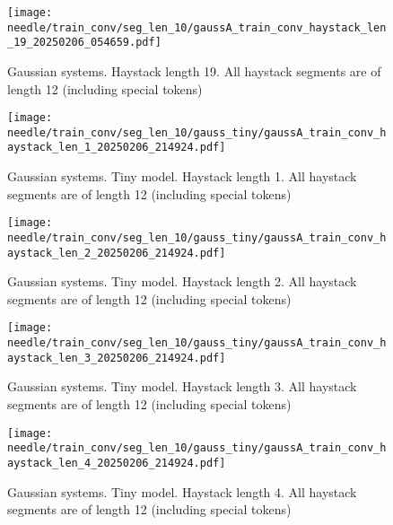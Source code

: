 \begin{figure}
    \centering
    \texttt{[image: needle/train\_conv/seg\_len\_10/gaussA\_train\_conv\_haystack\_len\_19\_20250206\_054659.pdf]}
    \caption{Gaussian systems. Haystack length 19. All haystack segments are of length 12 (including special tokens)}
    \label{fig:gauss_needle_train_conv_haystack_len_19_all_haystack_len_12}
\end{figure}




\begin{figure}[h]
    \centering
    \texttt{[image: needle/train\_conv/seg\_len\_10/gauss\_tiny/gaussA\_train\_conv\_haystack\_len\_1\_20250206\_214924.pdf]}
    \caption{Gaussian systems. Tiny model. Haystack length 1. All haystack segments are of length 12 (including special tokens)}
    \label{fig:gauss_tiny_needle_train_conv_haystack_len_1_all_haystack_len_12}
\end{figure}

\begin{figure}[h]
    \centering
    \texttt{[image: needle/train\_conv/seg\_len\_10/gauss\_tiny/gaussA\_train\_conv\_haystack\_len\_2\_20250206\_214924.pdf]}
    \caption{Gaussian systems. Tiny model. Haystack length 2. All haystack segments are of length 12 (including special tokens)}
    \label{fig:gauss_tiny_needle_train_conv_haystack_len_2_all_haystack_len_12}
\end{figure}

\begin{figure}[h]
    \centering
    \texttt{[image: needle/train\_conv/seg\_len\_10/gauss\_tiny/gaussA\_train\_conv\_haystack\_len\_3\_20250206\_214924.pdf]}
    \caption{Gaussian systems. Tiny model. Haystack length 3. All haystack segments are of length 12 (including special tokens)}
    \label{fig:gauss_tiny_needle_train_conv_haystack_len_3_all_haystack_len_12}
\end{figure}

\begin{figure}[h]
    \centering
    \texttt{[image: needle/train\_conv/seg\_len\_10/gauss\_tiny/gaussA\_train\_conv\_haystack\_len\_4\_20250206\_214924.pdf]}
    \caption{Gaussian systems. Tiny model. Haystack length 4. All haystack segments are of length 12 (including special tokens)}
    \label{fig:gauss_tiny_needle_train_conv_haystack_len_4_all_haystack_len_12}

\end{figure}

